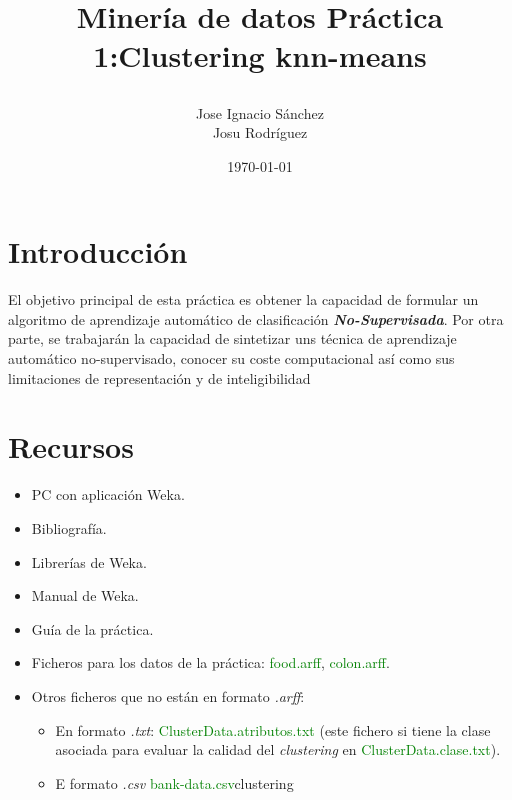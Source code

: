 \documentclass[10pt,a4paper]{article}
\author{Jose Ignacio Sánchez\\Josu Rodríguez}
\title{\begin{center}\textbf{\Huge{Minería de datos} Práctica 1:Clustering knn-means}
\end{center}}
\date{\today}
\newtheorem{defi}{(\it Definición)}[section]%
\begin{document}
\maketitle

\thispagestyle{empty}%

\newpage

\renewcommand\contentsname{\centering ÍNDICE DE CONTENIDO}
\tableofcontents%
\thispagestyle{empty}
\newpage

\renewcommand{\listtablename}{\centering ÍNDICE DE TABLAS} %
\listoftables
\thispagestyle{empty}
\newpage

\renewcommand\listfigurename{\centering ÍNDICE DE FIGURAS}
\thispagestyle{empty}
\listoffigures
\clearpage

\setcounter{page}{1}%

\section{Introducción}

El objetivo principal de esta práctica es obtener la capacidad de formular un
algoritmo de aprendizaje automático de clasificación \textbf{\textit{No-Supervisada}}. 
Por otra parte, se trabajarán la capacidad de sintetizar uns técnica de aprendizaje automático
no-supervisado, conocer su coste computacional así como sus limitaciones de representación
y de inteligibilidad \par


\section{Recursos}
\begin{itemize}
	\item PC con aplicación Weka.
	\item Bibliografía.
	\item Librerías de  Weka.
	\item Manual de Weka.
	\item Guía de la práctica.
	\item Ficheros para los datos de la
	práctica:
	\textcolor{green}{food.arff},
	\textcolor{green}{colon.arff}.
	\item Otros ficheros que no están en formato \textit{.arff}:
		\begin{itemize}
			\item En formato \textit{.txt}: \textcolor{green}{ClusterData.atributos.txt} (este fichero si tiene la clase asociada para 
			evaluar la calidad del \textit{clustering} en \textcolor{green}{ClusterData.clase.txt}).
			\item E formato \textit{.csv} \textcolor{green}{bank-data.csv}clustering
		\end{itemize}
\end{itemize}
\end{document}
